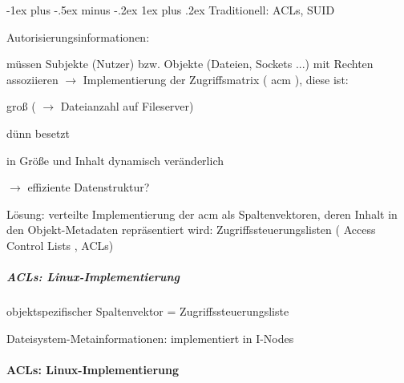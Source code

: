 \documentclass[a4paper]{article}
\makeatletter
\renewcommand{\subsubsection}{\@startsection{subsubsection}{3}{0mm}%
 {-1ex plus -.5ex minus -.2ex}%
 {1ex plus .2ex}%
 {\normalfont\small\bfseries}}
\makeatother
\begin{document}
\begin{multicols}{3}
    \subsubsection{Traditionell: ACLs, SUID}

    Autorisierungsinformationen:

    \begin{itemize*}
        \item
        müssen Subjekte (Nutzer) bzw. Objekte (Dateien, Sockets ...) mit
        Rechten assoziieren $\rightarrow$ Implementierung der
        Zugriffsmatrix ( acm ), diese ist:
        \begin{itemize*}
            \item groß ( $\rightarrow$ Dateianzahl auf Fileserver)
            \item dünn besetzt
            \item in Größe und Inhalt dynamisch veränderlich
            \item[$\rightarrow$] effiziente Datenstruktur?
        \end{itemize*}
        \item
        Lösung: verteilte Implementierung der acm als Spaltenvektoren, deren
        Inhalt in den Objekt-Metadaten repräsentiert wird:
        Zugriffssteuerungslisten ( Access Control Lists , ACLs)
    \end{itemize*}


    \subparagraph{ACLs:
        Linux-Implementierung}

    \begin{itemize*}
        \item
        objektspezifischer Spaltenvektor = Zugriffssteuerungsliste
        \item
        Dateisystem-Metainformationen: implementiert in I-Nodes
    \end{itemize*}



    \paragraph{ACLs:
        Linux-Implementierung}


\end{multicols}
\end{document}
